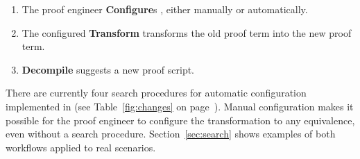 \begin{enumerate}
\item The proof engineer \textbf{Configure}s \toolname, either manually or automatically.
\item The configured \textbf{Transform} transforms the old proof term into the new proof term.
\item \textbf{Decompile} suggests a new proof script. %
\end{enumerate}
There are currently four search procedures for automatic configuration implemented in \toolname (see Table~\ref{fig:changes} on page~\pageref{fig:changes}).
Manual configuration makes it possible
for the proof engineer to configure the transformation to any equivalence,
even without a search procedure.
Section~\ref{sec:search} shows examples of both workflows applied to real scenarios.


